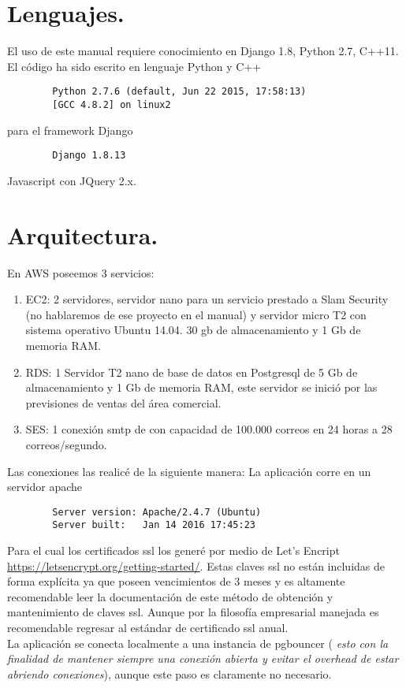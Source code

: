 \documentclass[10pt,a4paper]{book}
\begin{document}
	\section{Lenguajes.}
	El uso de este manual requiere conocimiento en Django 1.8, Python 2.7, C++11.
	El código ha sido escrito en lenguaje Python y C++
	\begin{verbatim}
		Python 2.7.6 (default, Jun 22 2015, 17:58:13)
		[GCC 4.8.2] on linux2
	\end{verbatim}
	para el framework Django
	\begin{verbatim}
		Django 1.8.13
	\end{verbatim}
	Javascript con JQuery 2.x.

	\section{Arquitectura.}
	En AWS poseemos 3 servicios:
	\begin{enumerate}
		\item EC2: 2 servidores, servidor nano para un servicio prestado a Slam Security (no hablaremos de ese proyecto en el manual) y servidor micro T2 con sistema operativo Ubuntu 14.04. 30 gb de almacenamiento y 1 Gb de memoria RAM.
		\item RDS: 1 Servidor T2 nano de base de datos en Postgresql de 5 Gb de almacenamiento y 1 Gb de memoria RAM, este servidor se inició por las previsiones de ventas del área comercial.
		\item SES: 1 conexión smtp de con capacidad de 100.000 correos en 24 horas a 28 correos/segundo.
	\end{enumerate}
	Las conexiones las realicé de la siguiente manera: La aplicación corre en un servidor apache

	\begin{verbatim}
		Server version: Apache/2.4.7 (Ubuntu)
		Server built:   Jan 14 2016 17:45:23
	\end{verbatim}
	
	Para el cual los certificados ssl los generé por medio de Let's Encript \url{https://letsencrypt.org/getting-started/}. Estas claves ssl no están incluidas de forma explícita ya que poseen vencimientos de 3 meses y es altamente recomendable leer la documentación de este método de obtención y mantenimiento de claves ssl. Aunque por la filosofía empresarial manejada es recomendable regresar al estándar de certificado ssl anual.\\
	
	La aplicación se conecta localmente a una instancia de pgbouncer ( \textit{esto con la finalidad de mantener siempre una conexión abierta y evitar el overhead de estar abriendo conexiones}), aunque este paso es claramente no necesario.
\end{document}
